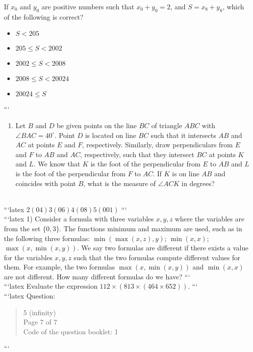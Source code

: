 If $x_0$ and $y_0$ are positive numbers such that $x_0 + y_0 = 2$, and $S = x_8 + y_8$, which of the following is correct?
\begin{itemize}
    \item $S < 205$
    \item $205 \leq S < 2002$
    \item $2002 \leq S < 2008$
    \item $2008 \leq S < 20024$
    \item $20024 \leq S$
\end{itemize}
```
\\
\begin{enumerate}
    \item Let $B$ and $D$ be given points on the line $BC$ of triangle $ABC$ with $\angle BAC = 40^\circ$. Point $D$ is located on line $BC$ such that it intersects $AB$ and $AC$ at points $E$ and $F$, respectively. Similarly, draw perpendiculars from $E$ and $F$ to $AB$ and $AC$, respectively, such that they intersect $BC$ at points $K$ and $L$. We know that $K$ is the foot of the perpendicular from $E$ to $AB$ and $L$ is the foot of the perpendicular from $F$ to $AC$. If $K$ is on line $AB$ and coincides with point $B$, what is the measure of $\angle ACK$ in degrees?
\end{enumerate}
\\
```latex
$2(04)3(06)4(08)5(001)$
```
\\
```latex
1) Consider a formula with three variables $x, y, z$ where the variables are from the set $\{0, 3\}$. The functions minimum and maximum are used, such as in the following three formulas: $\min(\max(x, z), y)$; $\min(x, x)$; $\max(x, \min(x, y))$. We say two formulas are different if there exists a value for the variables $x, y, z$ such that the two formulas compute different values for them. For example, the two formulas $\max(x, \min(x, y))$ and $\min(x, x)$ are not different. How many different formulas do we have?
```
\\
```latex
Evaluate the expression \( 112 \times (813 \times (464 \times 652)) \).
```
\\
```latex
Question:
\begin{quote}
5 (infinity) \\
Page 7 of 7 \\
Code of the question booklet: 1
\end{quote}
```
\\
